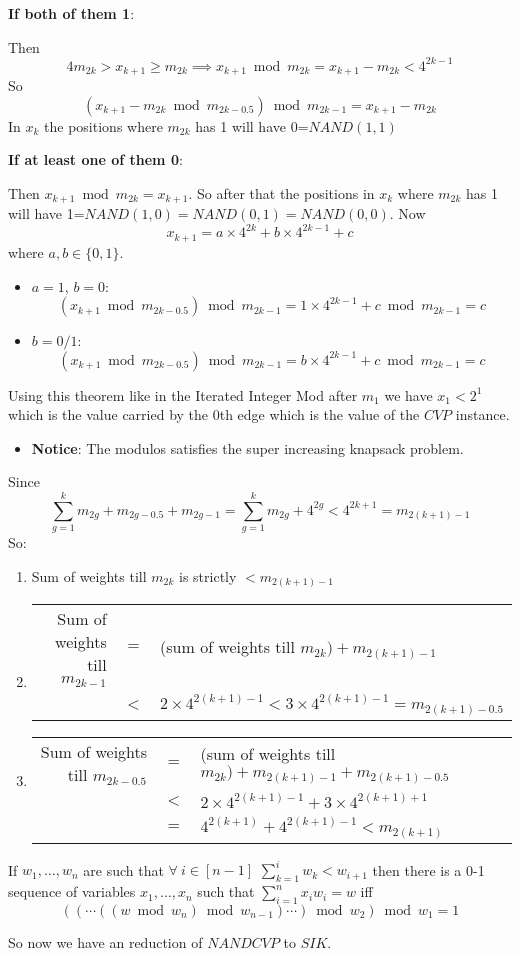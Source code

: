 \documentclass[article,8pt]{beamer}%
\begin{document}
\begin{frame}[allowframebreaks]
 \textbf{If both of them 1}:
 
  Then $$4m_{2k}>x_{k+1}\geq m_{2k}\implies x_{k+1}\bmod{m_{2k}}=x_{k+1}-m_{2k}<4^{2k-1}$$ So $$(x_{k+1}-m_{2k}\bmod{m_{2k-0.5}})\bmod{m_{2k-1}}=x_{k+1}-m_{2k}$$ In $x_k$ the positions where $m_{2k}$ has 1 will have 0=$NAND(1,1)$
  
\textbf{If at least one of them 0}:

 Then $x_{k+1}\bmod{m_{2k}}=x_{k+1}$. So after that the positions in $x_k$ where $m_{2k}$ has 1 will have 1=$NAND(1,0)=NAND(0,1)=NAND(0,0)$. Now $$x_{k+1}=a\times 4^{2k}+b\times 4^{2k-1}+c$$ where $a,b\in \{0,1\}$. \begin{itemize}
	\item $a=1$, $b=0$: $$(x_{k+1}\bmod{m_{2k-0.5}})\bmod{m_{2k-1}}=1\times 4^{2k-1}+c\bmod{m_{2k-1}}=c$$
	\item $b=0/1$: $$(x_{k+1}\bmod{m_{2k-0.5}})\bmod{m_{2k-1}}=b\times 4^{2k-1}+c\bmod{m_{2k-1}}=c$$
\end{itemize}
\framebreak

Using this theorem like in the Iterated Integer Mod after $m_1$ we have $x_1<2^1$ which is the value carried by the 0th edge which is the value of the $CVP$ instance. 

\begin{itemize}
	\item  \textbf{Notice}: The modulos  satisfies the super increasing knapsack problem. 
\end{itemize} 
 Since $$\sum\limits_{g=1}^{k}m_{2g}+m_{2g-0.5}+m_{2g-1}=\sum\limits_{g=1}^{k}m_{2g}+4^{2g}<4^{2k+1}=m_{2(k+1)-1}$$ So:
	\begin{enumerate}
		\item \hspace{1ex} Sum of weights till $m_{2k}$ is strictly $<m_{2(k+1)-1}$
		\item \begin{tabular}[t]{rcl}
			Sum of weights till $m_{2k-1}$ & $=$ &(sum of weights till $m_{2k})+m_{2(k+1)-1}$\\ & $<$ & $2\times 4^{2(k+1)-1}<3\times 4^{2(k+1)-1}=m_{2(k+1)-0.5}$
		\end{tabular}
		
		\item \begin{tabular}[t]{rcl}
			Sum of weights till $m_{2k-0.5}$ & $=$ & (sum of weights till $m_{2k})+m_{2(k+1)-1}+m_{2(k+1)-0.5}$\\ & $<$ & $2\times 4^{2(k+1)-1}+3\times 4^{2(k+1)+1}$\\
			& $=$ & $ 4^{2(k+1)}+4^{2(k+1)-1}<m_{2(k+1)}$
		\end{tabular}
	\end{enumerate}

\begin{theorem}
	If $w_1,\dots, w_n$ are such that $\forall \ i\in [n-1]$ $\sum\limits_{k=1}^{i}w_k<w_{i+1}$ then there is a 0-1 sequence of variables $x_1,\dots, x_n$ such that $\sum\limits_{i=1}^nx_iw_i=w$ iff $$((\cdots((w\bmod{w_n})\bmod{w_{n-1}})\cdots )\bmod{w_2})\bmod{w_1}=1$$
\end{theorem}
So now we have an reduction of $NANDCVP$ to $SIK$. 
\end{frame}
\end{document}

